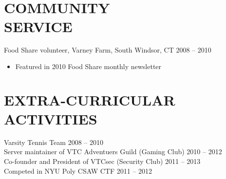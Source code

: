 \documentclass[margin]{res}
\begin{document}
\begin{resume}
\section{COMMUNITY \\ SERVICE} Food Share volunteer, Varney Farm, South 
                Windsor, CT \hfill 2008 -- 2010
                \begin{itemize}
                    \item Featured in 2010 Food Share monthly newsletter
                \end{itemize}

\section{EXTRA-CURRICULAR \\ ACTIVITIES} 
                Varsity Tennis Team \hfill 2008 -- 2010\\
                Server maintainer of VTC Adventuers Guild (Gaming Club)
                    \hfill 2010 -- 2012\\
                Co-founder and President of VTCsec (Security Club) 
                    \hfill 2011 -- 2013\\
                Competed in NYU Poly CSAW CTF \hfill 2011 -- 2012
 

\end{resume}
\end{document}
